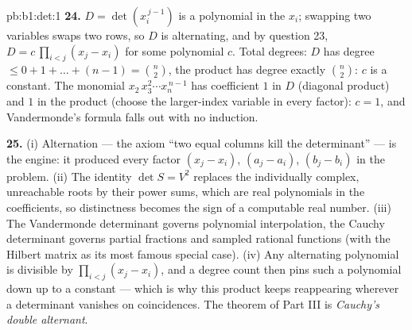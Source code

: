 \begin{solution}{pb:b1:det:1}
\textbf{24.} $D = \det(x_i^{\,j-1})$ is a polynomial in the
$x_i$; swapping two variables swaps two rows, so $D$ is
alternating, and by question 23, $D = c\,\prod_{i<j}(x_j - x_i)$
for some polynomial $c$. Total degrees: $D$ has degree $\leq 0 +
1 + \dots + (n-1) = \binom n2$, the product has degree exactly
$\binom n2$: $c$ is a constant. The monomial $x_2\,x_3^2\cdots
x_n^{\,n-1}$ has coefficient $1$ in $D$ (diagonal product) and
$1$ in the product (choose the larger-index variable in every
factor): $c = 1$, and Vandermonde's formula falls out with no
induction.

\textbf{25.} (i) Alternation --- the axiom ``two equal columns
kill the determinant'' --- is the engine: it produced every
factor $(x_j - x_i)$, $(a_j - a_i)$, $(b_j - b_i)$ in the
problem. (ii) The identity $\det S = V^2$ replaces the
individually complex, unreachable roots by their power sums,
which are real polynomials in the coefficients, so distinctness
becomes the sign of a computable real number. (iii) The
Vandermonde determinant governs polynomial interpolation, the
Cauchy determinant governs partial fractions and sampled
rational functions (with the Hilbert matrix as its most famous
special case). (iv) Any alternating polynomial is divisible by
$\prod_{i<j}(x_j - x_i)$, and a degree count then pins such a
polynomial down up to a constant --- which is why this product
keeps reappearing wherever a determinant vanishes on
coincidences. The theorem of Part III is \emph{Cauchy's double
alternant}.
\end{solution}
